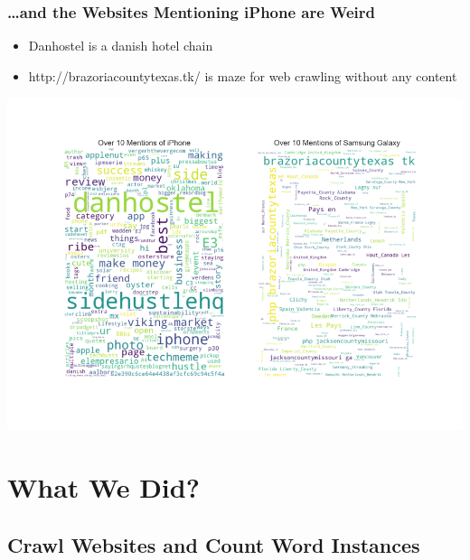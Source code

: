 \documentclass[10pt]{beamer}
\begin{document}
\begin{frame}
\frametitle{\ldots and the Websites Mentioning iPhone are Weird}

\begin{itemize}
    \item Danhostel is a danish hotel chain
    \item http://brazoriacountytexas.tk/ is maze for web crawling without any content
\end{itemize}

{
    \centering
    \includegraphics[width=\textwidth,height=\textheight,keepaspectratio]{wordclouds_for_sites_with_lots_of_mentions.png}
    \par
}


\end{frame}

\section{What We Did?}


\subsection{Crawl Websites and Count Word Instances}
\end{document}
